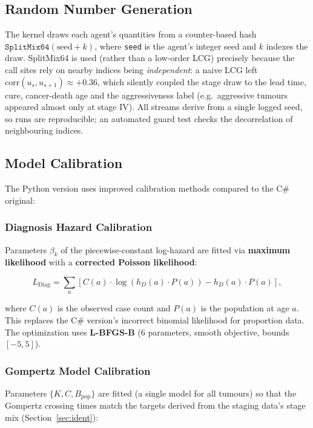 \documentclass[12pt,a4paper]{article}
\begin{document}
\subsection{Random Number Generation}

The kernel draws each agent's quantities from a counter-based hash $\texttt{SplitMix64}(\text{seed} + k)$, where \texttt{seed} is the agent's integer seed and $k$ indexes the draw. SplitMix64 is used (rather than a low-order LCG) precisely because the call sites rely on nearby indices being \emph{independent}: a naive LCG left $\mathrm{corr}(u_s, u_{s+1}) \approx +0.36$, which silently coupled the stage draw to the lead time, cure, cancer-death age and the aggressiveness label (e.g.\ aggressive tumours appeared almost only at stage IV). All streams derive from a single logged seed, so runs are reproducible; an automated guard test checks the decorrelation of neighbouring indices.

\subsection{Model Calibration}
\label{sec:calibration}

The Python version uses improved calibration methods compared to the C\# original:

\subsubsection{Diagnosis Hazard Calibration}

Parameters $\beta_k$ of the piecewise-constant log-hazard are fitted via \textbf{maximum likelihood} with a \textbf{corrected Poisson likelihood}:

\begin{equation}
    L_{\text{Diag}} = \sum_{a} \left[ C(a) \cdot \log(h_D(a) \cdot P(a)) - h_D(a) \cdot P(a) \right],
\end{equation}

where $C(a)$ is the observed case count and $P(a)$ is the population at age $a$. This replaces the C\# version's incorrect binomial likelihood for proportion data. The optimization uses \textbf{L-BFGS-B} (6 parameters, smooth objective, bounds $[-5, 5]$).

\subsubsection{Gompertz Model Calibration}

Parameters $\{K, C, B_{\text{pop}}\}$ are fitted (a single model for all tumours) so that the Gompertz crossing times match the targets derived from the staging data's stage mix (Section~\ref{sec:ident}):
\end{document}
